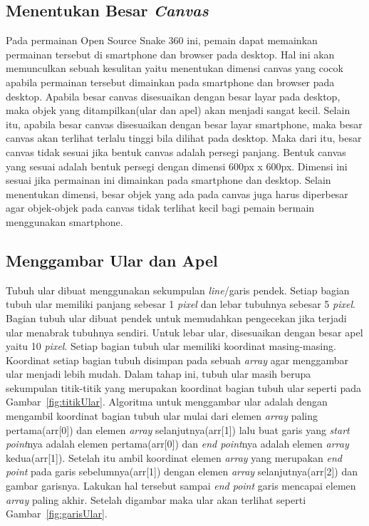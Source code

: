 \subsection{Menentukan Besar \textit{Canvas}}
Pada permainan Open Source Snake 360 ini, pemain dapat memainkan permainan tersebut di smartphone dan browser pada desktop. Hal ini akan memunculkan sebuah kesulitan yaitu menentukan dimensi canvas yang cocok apabila permainan tersebut dimainkan pada smartphone dan browser pada desktop. Apabila besar canvas disesuaikan dengan besar layar pada desktop, maka objek yang ditampilkan(ular dan apel) akan menjadi sangat kecil. Selain itu, apabila besar canvas disesuaikan dengan besar layar smartphone, maka besar canvas akan terlihat terlalu tinggi bila dilihat pada desktop. Maka dari itu, besar canvas tidak sesuai jika bentuk canvas adalah persegi panjang. Bentuk canvas yang sesuai adalah bentuk persegi dengan dimensi 600px x 600px. Dimensi ini sesuai jika permainan ini dimainkan pada smartphone dan desktop. Selain menentukan dimensi, besar objek yang ada pada canvas juga harus diperbesar agar objek-objek pada canvas tidak terlihat kecil bagi pemain bermain menggunakan smartphone.

\subsection{Menggambar Ular dan Apel}
Tubuh ular dibuat menggunakan sekumpulan \textit{line}/garis pendek. Setiap bagian tubuh ular memiliki panjang sebesar 1 \textit{pixel} dan lebar tubuhnya sebesar 5 \textit{pixel}. Bagian tubuh ular dibuat pendek untuk memudahkan pengecekan jika terjadi ular menabrak tubuhnya sendiri. Untuk lebar ular, disesuaikan dengan besar apel yaitu 10 \textit{pixel}. Setiap bagian tubuh ular memiliki koordinat masing-masing. Koordinat setiap bagian tubuh disimpan pada sebuah \textit{array} agar menggambar ular menjadi lebih mudah. Dalam tahap ini, tubuh ular masih berupa sekumpulan titik-titik yang merupakan koordinat bagian tubuh ular seperti pada Gambar~\ref{fig:titikUlar}. Algoritma untuk menggambar ular adalah dengan mengambil koordinat bagian tubuh ular mulai dari elemen \textit{array} paling pertama(arr[0]) dan elemen \textit{array} selanjutnya(arr[1]) lalu buat garis yang \textit{start point}nya adalah elemen pertama(arr[0]) dan \textit{end point}nya adalah elemen \textit{array} kedua(arr[1]). Setelah itu ambil koordinat elemen \textit{array} yang merupakan \textit{end point} pada garis sebelumnya(arr[1]) dengan elemen \textit{array} selanjutnya(arr[2]) dan gambar garisnya. Lakukan hal tersebut sampai \textit{end point} garis mencapai elemen \textit{array} paling akhir. Setelah digambar maka ular akan terlihat seperti Gambar~\ref{fig:garisUlar}.

